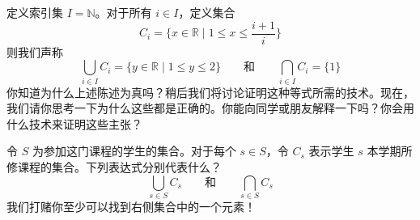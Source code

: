 \begin{example}
    定义索引集 $I = \mathbb{N}$。对于所有 $i \in I$，定义集合
    \[C_i = \Bigg\{x \in \mathbb{R} \mid 1 \le x \le \frac{i + 1}{i}\Bigg\}\]
    则我们声称
    \[\bigcup_{i \in I} C_i = \{y \in \mathbb{R} \mid 1 \le y \le 2\} \qquad\text{和}\qquad \bigcap_{i \in I} C_i = \{1\}\]
    你知道为什么上述陈述为真吗？稍后我们将讨论证明这种等式所需的技术。现在，我们请你思考一下为什么这些都是正确的。你能向同学或朋友解释一下吗？你会用什么技术来证明这些主张？ 
\end{example}

\begin{example}
    令 $S$ 为参加这门课程的学生的集合。对于每个 $s \in S$，令 $C_s$ 表示学生 $s$ 本学期所修课程的集合。下列表达式分别代表什么？
    \[\bigcup_{s \in S} C_s \qquad\text{和}\qquad \bigcap_{s \in S} C_s\]
    我们打赌你至少可以找到右侧集合中的一个元素！
\end{example}
